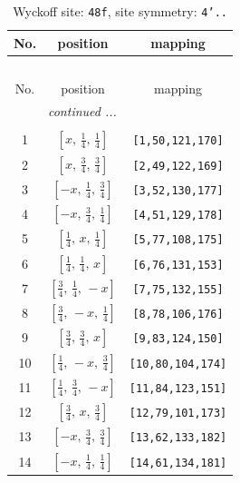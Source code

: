 \documentclass[fleqn,8pt]{jsarticle}
\begin{document}
\begin{longtable}{ccc}
\caption{Wyckoff site: {\tt 48f}, site symmetry: {\tt 4'..}}
 \\
 \hline \hline
No. & position & mapping \\ \hline \endfirsthead

\multicolumn{2}{l}{\tablename\ \thetable{}} \\
 \hline \hline
No. & position & mapping \\ \hline \endhead

 \hline \hline
\multicolumn{2}{r}{\footnotesize\it continued ...} \\ \endfoot

 \hline \hline
\multicolumn{2}{r}{} \\ \endlastfoot

1 & $\left[ x,\, \frac{1}{4},\, \frac{1}{4} \right]$ & {\tt [1,50,121,170]} \\ \hline
2 & $\left[ x,\, \frac{3}{4},\, \frac{3}{4} \right]$ & {\tt [2,49,122,169]} \\ \hline
3 & $\left[ - x,\, \frac{1}{4},\, \frac{3}{4} \right]$ & {\tt [3,52,130,177]} \\ \hline
4 & $\left[ - x,\, \frac{3}{4},\, \frac{1}{4} \right]$ & {\tt [4,51,129,178]} \\ \hline
5 & $\left[ \frac{1}{4},\, x,\, \frac{1}{4} \right]$ & {\tt [5,77,108,175]} \\ \hline
6 & $\left[ \frac{1}{4},\, \frac{1}{4},\, x \right]$ & {\tt [6,76,131,153]} \\ \hline
7 & $\left[ \frac{3}{4},\, \frac{1}{4},\, - x \right]$ & {\tt [7,75,132,155]} \\ \hline
8 & $\left[ \frac{3}{4},\, - x,\, \frac{1}{4} \right]$ & {\tt [8,78,106,176]} \\ \hline
9 & $\left[ \frac{3}{4},\, \frac{3}{4},\, x \right]$ & {\tt [9,83,124,150]} \\ \hline
10 & $\left[ \frac{1}{4},\, - x,\, \frac{3}{4} \right]$ & {\tt [10,80,104,174]} \\ \hline
11 & $\left[ \frac{1}{4},\, \frac{3}{4},\, - x \right]$ & {\tt [11,84,123,151]} \\ \hline
12 & $\left[ \frac{3}{4},\, x,\, \frac{3}{4} \right]$ & {\tt [12,79,101,173]} \\ \hline
13 & $\left[ - x,\, \frac{3}{4},\, \frac{3}{4} \right]$ & {\tt [13,62,133,182]} \\ \hline
14 & $\left[ - x,\, \frac{1}{4},\, \frac{1}{4} \right]$ & {\tt [14,61,134,181]} \\ \hline

\end{longtable}
\end{document}
